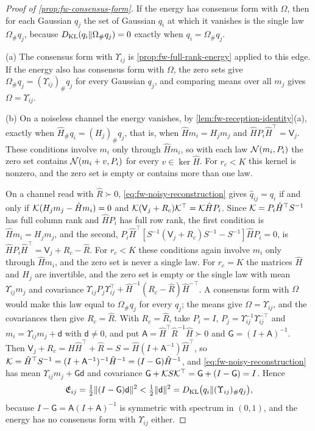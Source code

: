 \begin{proof}[Proof of \cref{prop:fw-consensus-form}]
If the energy has consensus form with $\Omega$, then for each Gaussian $q_j$ the set of Gaussian $q_i$ at which it vanishes is the single law $\Omega_\#q_j$, because $D_{\mathrm{KL}}(q_i\Vert\Omega_\#q_j)=0$ exactly when $q_i=\Omega_\#q_j$.

(a) The consensus form with $\Upsilon_{ij}$ is \cref{prop:fw-full-rank-energy} applied to this edge. If the energy also has consensus form with $\Omega$, the zero sets give $\Omega_\#q_j=(\Upsilon_{ij})_\#q_j$ for every Gaussian $q_j$, and comparing means over all $m_j$ gives $\Omega=\Upsilon_{ij}$.

(b) On a noiseless channel the energy vanishes, by \cref{lem:fw-reception-identity}(a), exactly when $\hat H_\#q_i=(H_j)_\#q_j$, that is, when $\hat Hm_i=H_jm_j$ and $\hat HP_i\hat H^\top=\mathsf V_j$. These conditions involve $m_i$ only through $\hat Hm_i$, so with each law $\mathcal{N}(m_i,P_i)$ the zero set contains $\mathcal{N}(m_i+v,P_i)$ for every $v\in\ker\hat H$. For $r_c<K$ this kernel is nonzero, and the zero set is empty or contains more than one law.

On a channel read with $\hat R\succ0$, \eqref{eq:fw-noisy-reconstruction} gives $\hat q_{ij}=q_i$ if and only if $\mathcal{K}(H_jm_j-\hat Hm_i)=0$ and $\mathcal{K}(\mathsf V_j+R_c)\mathcal{K}^\top=\mathcal{K}\hat HP_i$. Since $\mathcal{K}=P_i\hat H^\top S^{-1}$ has full column rank and $\hat HP_i$ has full row rank, the first condition is $\hat Hm_i=H_jm_j$, and the second, $P_i\hat H^\top[S^{-1}(\mathsf V_j+R_c)S^{-1}-S^{-1}]\hat HP_i=0$, is $\hat HP_i\hat H^\top=\mathsf V_j+R_c-\hat R$. For $r_c<K$ these conditions again involve $m_i$ only through $\hat Hm_i$, and the zero set is never a single law. For $r_c=K$ the matrices $\hat H$ and $H_j$ are invertible, and the zero set is empty or the single law with mean $\Upsilon_{ij}m_j$ and covariance $\Upsilon_{ij}P_j\Upsilon_{ij}^\top+\hat H^{-1}(R_c-\hat R)\hat H^{-\top}$. A consensus form with $\Omega$ would make this law equal to $\Omega_\#q_j$ for every $q_j$; the means give $\Omega=\Upsilon_{ij}$, and the covariances then give $R_c=\hat R$. With $R_c=\hat R$, take $P_i=I$, $P_j=\Upsilon_{ij}^{-1}\Upsilon_{ij}^{-\top}$ and $m_i=\Upsilon_{ij}m_j+\mathsf d$ with $\mathsf d\ne0$, and put $\mathsf A=\hat H^\top\hat R^{-1}\hat H\succ0$ and $\mathsf G=(I+\mathsf A)^{-1}$. Then $\mathsf V_j+R_c=\hat H\hat H^\top+\hat R=S=\hat H(I+\mathsf A^{-1})\hat H^\top$, so $\mathcal{K}=\hat H^\top S^{-1}=(I+\mathsf A^{-1})^{-1}\hat H^{-1}=(I-\mathsf G)\hat H^{-1}$, and \eqref{eq:fw-noisy-reconstruction} has mean $\Upsilon_{ij}m_j+\mathsf G\mathsf d$ and covariance $\mathsf G+\mathcal{K} S\mathcal{K}^\top=\mathsf G+(I-\mathsf G)=I$. Hence
\[
\mathfrak E_{ij}=\tfrac12\Vert(I-\mathsf G)\mathsf d\Vert^2<\tfrac12\Vert\mathsf d\Vert^2=D_{\mathrm{KL}}\bigl(q_i\Vert(\Upsilon_{ij})_\#q_j\bigr),
\]
because $I-\mathsf G=\mathsf A(I+\mathsf A)^{-1}$ is symmetric with spectrum in $(0,1)$, and the energy has no consensus form with $\Upsilon_{ij}$ either.
\end{proof}

